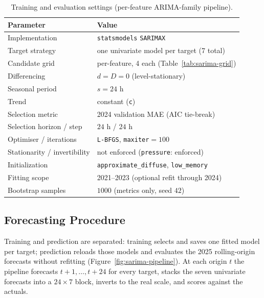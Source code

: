 \documentclass[12pt,a4paper,oneside]{report}
\begin{document}
\begin{table}[H]
\centering
\caption{Training and evaluation settings (per-feature ARIMA-family pipeline).}
\label{tab:sarima-hparams}
\begin{tabular}{ll}
\toprule
\textbf{Parameter} & \textbf{Value} \\
\midrule
Implementation               & \texttt{statsmodels} \texttt{SARIMAX} \\
Target strategy              & one univariate model per target (7 total) \\
Candidate grid               & per-feature, 4 each (Table~\ref{tab:sarima-grid}) \\
Differencing                 & $d=D=0$ (level-stationary) \\
Seasonal period              & $s=24$ h \\
Trend                        & constant (\texttt{c}) \\
Selection metric             & 2024 validation MAE (AIC tie-break) \\
Selection horizon / step     & $24$ h / $24$ h \\
Optimiser / iterations       & \texttt{L-BFGS}, \texttt{maxiter}$=100$ \\
Stationarity / invertibility & not enforced (\texttt{pressure}: enforced) \\
Initialization               & \texttt{approximate\_diffuse}, \texttt{low\_memory} \\
Fitting scope                & 2021--2023 (optional refit through 2024) \\
Bootstrap samples            & $1000$ (metrics only, seed $42$) \\
\bottomrule
\end{tabular}
\end{table}

\subsection{Forecasting Procedure}
\label{sec:sarima-predict}
Training and prediction are separated: training selects and saves one fitted
model per target; prediction reloads those models and evaluates the 2025
rolling-origin forecasts without refitting (Figure~\ref{fig:sarima-pipeline}).
At each origin $t$ the pipeline forecasts $t{+}1,\dots,t{+}24$ for every target,
stacks the seven univariate forecasts into a $24 \times 7$ block, inverts to the
real scale, and scores against the actuals.
\end{document}

